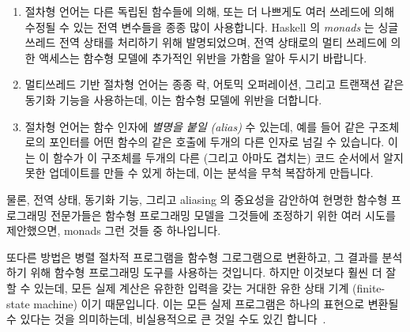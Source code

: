 \fi

\begin{enumerate}
\item	절차형 언어는 다른 독립된 함수들에 의해, 또는 더 나쁘게도 여러 쓰레드에
	의해 수정될 수 있는 전역 변수들을 종종 많이 사용합니다.
	Haskell 의 \emph{monads} 는 싱글 쓰레드 전역 상태를 처리하기 위해
	발명되었으며, 전역 상태로의 멀티 쓰레드에 의한 액세스는 함수형 모델에
	추가적인 위반을 가함을 알아 두시기 바랍니다.
\item	멀티쓰레드 기반 절차형 언어는 종종 락, 어토믹 오퍼레이션, 그리고
	트랜잭션 같은 동기화 기능을 사용하는데, 이는 함수형 모델에 위반을
	더합니다.
\item	절차형 언어는 함수 인자에 \emph{별명을 붙일 (alias)} 수 있는데, 예를
	들어 같은 구조체로의 포인터를 어떤 함수의 같은 호출에 두개의 다른
	인자로 넘길 수 있습니다.
	이는 이 함수가 이 구조체를 두개의 다른 (그리고 아마도 겹치는) 코드
	순서에서 알지 못한 업데이트를 만들 수 있게 하는데, 이는 분석을 무척
	복잡하게 만듭니다.

\iffalse

\item	Procedural languages often make heavy use of global variables,
	which can be updated independently by different
	functions, or, worse yet, by multiple threads.
	Note that Haskell's \emph{monads} were invented to deal with
	single-threaded global state, and that multi-threaded access to
	global state inflicts additional violence on the functional model.
\item	Multithreaded procedural languages often use synchronization
	primitives such as locks, atomic operations, and transactions,
	which inflict added violence upon the functional model.
\item	Procedural languages can \emph{alias} function arguments,
	for example, by passing a pointer to the same structure via two
	different arguments to the same invocation of a given function.
	This can result in the function unknowingly updating that
	structure via two different (and possibly overlapping) code
	sequences, which greatly complicates analysis.

\fi

\end{enumerate}

물론, 전역 상태, 동기화 기능, 그리고 aliasing 의 중요성을 감안하여 현명한
함수형 프로그래밍 전문가들은 함수형 프로그래밍 모델을 그것들에 조정하기 위한
여러 시도를 제안했으면, monads 그런 것들 중 하나입니다.

또다른 방법은 병렬 절차적 프로그램을 함수형 그로그램으로 변환하고, 그 결과를
분석하기 위해 함수형 프로그래밍 도구를 사용하는 것입니다.
하지만 이것보다 훨씬 더 잘할 수 있는데, 모든 실제 계산은 유한한 입력을 갖는
거대한 유한 상태 기계 (finite-state machine) 이기 때문입니다.
이는 모든 실제 프로그램은 하나의 표현으로 변환될 수 있다는 것을 의미하는데,
비실용적으로 큰 것일 수도 있긴 합니다~\cite{VijayDSilva2012-sas}.

